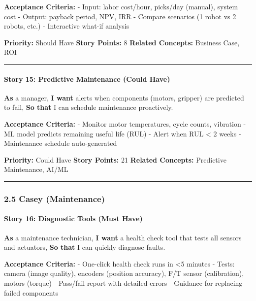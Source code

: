 \documentclass[
]{article}
\begin{document}
\textbf{Acceptance Criteria:} - Input: labor cost/hour, picks/day
(manual), system cost - Output: payback period, NPV, IRR - Compare
scenarios (1 robot vs 2 robots, etc.) - Interactive what-if analysis

\textbf{Priority:} Should Have \textbf{Story Points:} 8 \textbf{Related
Concepts:} Business Case, ROI

\begin{center}\rule{0.5\linewidth}{0.5pt}\end{center}

\hypertarget{story-15-predictive-maintenance-could-have}{%
\paragraph{Story 15: Predictive Maintenance (Could
Have)}\label{story-15-predictive-maintenance-could-have}}

\textbf{As} a manager, \textbf{I want} alerts when components (motors,
gripper) are predicted to fail, \textbf{So that} I can schedule
maintenance proactively.

\textbf{Acceptance Criteria:} - Monitor motor temperatures, cycle
counts, vibration - ML model predicts remaining useful life (RUL) -
Alert when RUL \textless{} 2 weeks - Maintenance schedule auto-generated

\textbf{Priority:} Could Have \textbf{Story Points:} 21 \textbf{Related
Concepts:} Predictive Maintenance, AI/ML

\begin{center}\rule{0.5\linewidth}{0.5pt}\end{center}

\hypertarget{casey-maintenance}{%
\subsubsection{2.5 Casey (Maintenance)}\label{casey-maintenance}}

\hypertarget{story-16-diagnostic-tools-must-have}{%
\paragraph{Story 16: Diagnostic Tools (Must
Have)}\label{story-16-diagnostic-tools-must-have}}

\textbf{As} a maintenance technician, \textbf{I want} a health check
tool that tests all sensors and actuators, \textbf{So that} I can
quickly diagnose faults.

\textbf{Acceptance Criteria:} - One-click health check runs in
\textless5 minutes - Tests: camera (image quality), encoders (position
accuracy), F/T sensor (calibration), motors (torque) - Pass/fail report
with detailed errors - Guidance for replacing failed components
\end{document}
